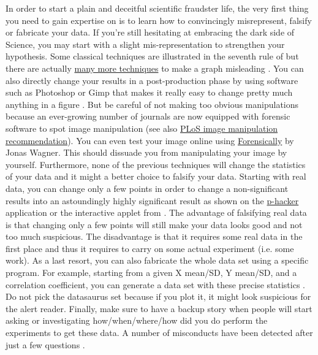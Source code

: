 \documentclass[a4paper,10pt,onecolumn]{article}
\begin{document}
In order to start a plain and deceitful scientific fraudster life, the very
first thing you need to gain expertise on is to learn how to convincingly
misrepresent, falsify or fabricate your data. If you're still hesitating at
embracing the dark side of Science, you may start with a slight
mis-representation to strengthen your hypothesis. Some classical techniques are
illustrated in the seventh rule of \citep{rougier:2014} but there are
actually \href{https://en.wikipedia.org/wiki/Misleading_graph}{many more
  techniques} to make a graph misleading \citep{wainer:1984,raschke:2008}. You
can also directly change your results in a post-production phase by using
software such as Photoshop or Gimp that makes it really easy to change pretty
much anything in a figure \citep{cromey:2012, hendricks:2011}. But be careful
of not making too obvious manipulations because an ever-growing number of
journals are now equipped with forensic software to spot image manipulation
\citep{white:2007, rossner:2004,hsu:2015} (see also
\href{http://journals.plos.org/ploscompbiol/s/figures#loc-image-manipulation}{PLoS
  image manipulation recommendation}). You can even test your image online
using \href{https://29a.ch/photo-forensics/#forensic-magnifier}{Forensically}
by Jonas Wagner. This should dissuade you from manipulating your image by
yourself.
%
%
Furthermore, none of the previous techniques will change the statistics of your
data and it might a better choice to falsify your data. Starting with real
data, you can change only a few points in order to change a non-significant
results into an astoundingly highly significant result as shown on the
\href{http://shinyapps.org/apps/p-hacker/}{p-hacker} application
\citep{schonbrodt:2015} or the interactive applet from
\citep{aschwanden:2015}. The advantage of falsifying real data is that changing
only a few points will still make your data looks good and not too much
suspicious. The disadvantage is that it requires some real data in the first
place and thus it requires to carry on some actual experiment (i.e. some
work). As a last resort, you can also fabricate the whole data set using a
specific program. For example, starting from a given X mean/SD, Y mean/SD, and
a correlation coefficient, you can generate a data set with these precise
statistics \citep{matejka:2017}. Do not pick the datasaurus set because if you
plot it, it might look suspicious for the alert reader. Finally, make sure to
have a backup story when people will start asking or investigating
how/when/where/how did you do perform the experiments to get these data. A
number of misconducts have been detected after just a few questions
\citep{vastag:2006}.
\end{document}
